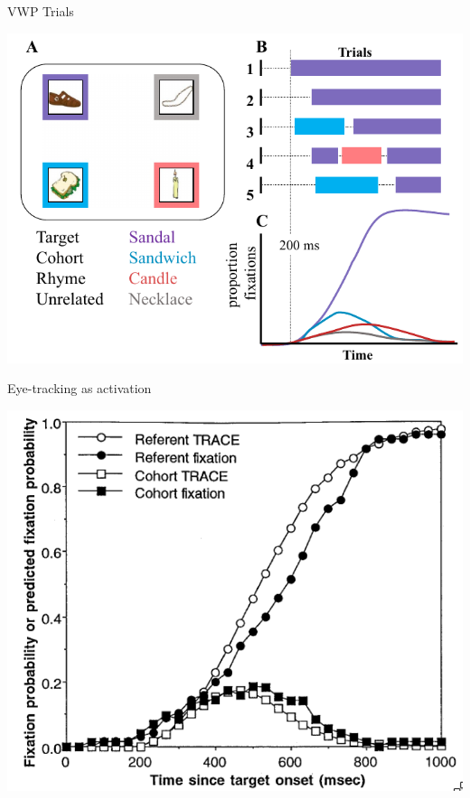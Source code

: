 \documentclass{beamer}
\begin{document}
\begin{frame}{VWP Trials}
\begin{center}
\includegraphics[scale=0.4]{img/bob_vwp_full.png}
\end{center}
\end{frame}

\begin{frame}{Eye-tracking as activation}
\begin{center}
\includegraphics[scale=0.45]{img/allopenna_trace_compare.png}
\end{center}
\end{frame}
\end{document}
